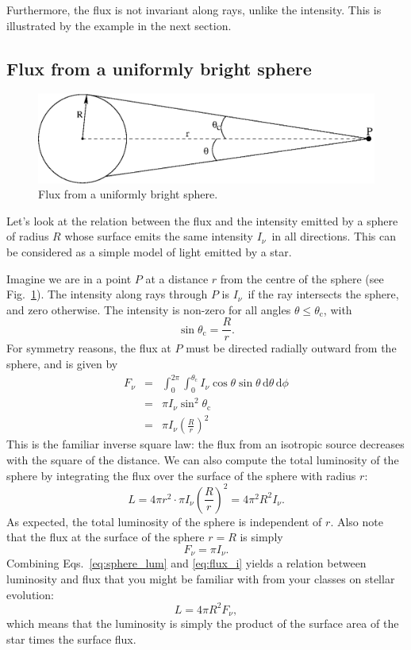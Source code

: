\documentclass[12pt]{article}
\numberwithin{equation}{section}
\def\dd{\mathrm{d}}
\def\Inu{\ensuremath{I_{\nu}}}
\newcommand{\be}{\begin{equation}}
\newcommand{\ee}{\end{equation}}
\newcommand{\bea}{\begin{eqnarray}}
\newcommand{\eea}{\end{eqnarray}}
\begin{document}
Furthermore, the flux is not invariant along rays, unlike the intensity. This is illustrated by the example in the next section.

\subsection{Flux from a uniformly bright sphere}

\begin{figure}
  \centering
  \includegraphics[width=12cm]{figs/bright_sphere}
  \caption{Flux from a uniformly bright sphere.
  \label{fig:bright_sphere}}
\end{figure}


Let's look at the relation between the flux and the intensity emitted by a sphere of radius $R$ whose surface emits the same intensity \Inu\ in all directions. This can be considered as a simple model of light emitted by a star. 

Imagine we are in a point $P$ at a distance $r$ from the centre of the sphere (see Fig.~\ref{fig:bright_sphere}). The intensity along rays through $P$ is \Inu\ if the ray intersects the sphere, and zero otherwise. The intensity is non-zero for all angles $\theta \leq \theta_\mathrm{c}$, with 
\be
\sin \theta_\mathrm{c} = \frac{R}{r}.
\ee
For symmetry reasons, the flux at $P$  must be directed radially outward from the sphere, and is given by
\bea
F_\nu &=& \int_0^{2\pi} \int_0^{\theta_\mathrm{c}} \Inu \cos \theta \sin \theta \, \dd \theta\, \dd \phi \nonumber \\ 
  & = & \pi \Inu \sin^2 \theta_\mathrm{c} \nonumber \\ 
  & = & \pi \Inu \left( \frac{R}{r} \right)^2
\eea
This is the familiar inverse square law: the flux from an isotropic source decreases with the square of the distance. We can also compute the total luminosity of the sphere by integrating the flux over the surface of the sphere with radius $r$:
\be
L  = 4 \pi r^2 \cdot \pi \Inu \left( \frac{R}{r} \right)^2 = 4 \pi^2 R^2 \Inu. \label{eq:sphere_lum}
\ee
As expected, the total luminosity of the sphere is independent of $r$. Also note that the flux at the surface of the sphere $r=R$ is simply
\be
F_\nu = \pi \Inu.\label{eq:flux_i}
\ee
Combining Eqs.~\ref{eq:sphere_lum} and \ref{eq:flux_i} yields a relation between luminosity and flux that you might be familiar with from your classes on stellar evolution:
\be
L = 4 \pi R^2 F_\nu,
\ee
which means that the luminosity is simply the product of the surface area of the star times the surface flux.
\end{document}
